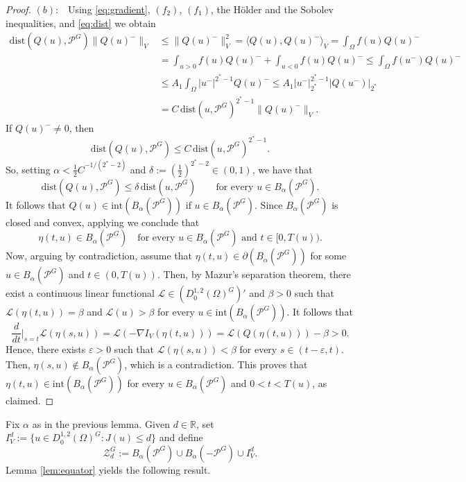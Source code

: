 \documentclass[10pt,letterpaper]{article}
\numberwithin{equation}{section}
\def\r{\mathbb{R}}
\def\eps{\varepsilon}
\def\o{\Omega}
\def\cP{\mathcal{P}}
\def\cZ{\mathcal{Z}}
\begin{document}
\begin{proof}
$(b):$ \ Using \eqref{eq:gradient}, $(f_2)$, $(f_1)$, the Hölder and the Sobolev inequalities, and \eqref{eq:dist} we obtain
\begin{align*}
\mathrm{dist} (Q(u), \cP^G) \|Q(u)^{-}\|_V &\leq \|Q(u)^{-}\|_V^2 = \langle Q(u), Q(u)^- \rangle_V = \int_{\Omega} f(u) Q(u)^- \\
&= \int_{u>0} f(u) Q(u)^- + \int_{u<0} f(u) Q(u)^- \leq \int_{\Omega} f(u^-) Q(u)^-\\
&\leq A_1\int_{\Omega} |u^-|^{2^*-1} Q(u)^{-} \leq A_1|u^-|_{2^*}^{2^*-1}|Q(u^-)|_{2^*}\\
&=C\,\mathrm{dist}(u, \cP^G )^{2^*-1} \|Q(u)^-\|_V.
\end{align*}
If $Q(u)^-\neq 0$, then 
$$\text{dist}(Q(u),\cP^G) \leq C\, \mathrm{dist}(u,\cP^G)^{2^*-1}. $$
So, setting $\alpha < \frac{1}{2}C^{-1/(2^*-2)}$ and $\delta:=(\frac{1}{2})^{2^*-2} \in (0,1)$, we have that
$$\mathrm{dist} (Q(u),\cP^G) \leq \delta\,\mathrm{dist} (u, \cP^G) \qquad \text{for every \ } u \in B_{\alpha}(\cP^G).$$
It follows that $Q(u)\in\mathrm{int}(B_{\alpha}(\cP^G))$ if $u\in B_{\alpha}(\cP^G).$ Since $B_\alpha(\cP^G)$ is closed and convex, applying \cite[Theorem 5.2]{d} we conclude that
\begin{equation} \label{eq:invariance}
\eta(t,u) \in B_\alpha(\cP^G) \quad \text{for every }u\in B_\alpha(\cP^G)\text{ \ and \ } t \in [0,T(u)).
\end{equation}
Now, arguing by contradiction, assume that $\eta(t,u) \in \partial(B_{\alpha}(\cP^G))$ for some $u \in B_{\alpha}(\cP^G)$ and $t \in (0,T(u))$. Then, by Mazur's separation theorem, there exist a continuous linear functional $\mathscr{L} \in (D^{1,2}_0(\o)^G)'$ and $\beta >0$ such that $\mathscr{L}(\eta(t,u))= \beta$ and $\mathscr{L}(u)> \beta$ for every $u \in \text{int}(B_{\alpha}(\mathcal{P}^G))$.
It follows that
$$\frac{d}{dt} \Big|_{s=t}\mathscr{L}(\eta(s,u))=\mathscr{L}(- \nabla I_V(\eta(t,u)))= \mathscr{L}(Q(\eta(t,u))) - \beta >0.$$
Hence, there exists $\eps>0$ such that $\mathscr{L} (\eta(s,u))<\beta$ for every $s \in( t-\eps,t)$. Then, $\eta(s,u) \notin B_{\alpha}(\cP^G)$, which is a  contradiction. This proves that $\eta(t,u) \in \mathrm{int}(B_{\alpha}(\cP^G))$ for every $u\in B_\alpha(\cP^G)$ and $0<t < T(u)$, as claimed.
\end{proof}

Fix $\alpha$ as in the previous lemma. Given $d\in\r$, set $I^d_V:=\{u\in D^{1,2}_0(\o)^G:J(u)\leq d\}$ and define
\begin{equation*}
\cZ_d^G:=B_{\alpha} (\cP^G) \cup B_{\alpha}(- \cP^G)\cup I^d_V.
\end{equation*}
Lemma \ref{lem:equator} yields the following result.
\end{document}
